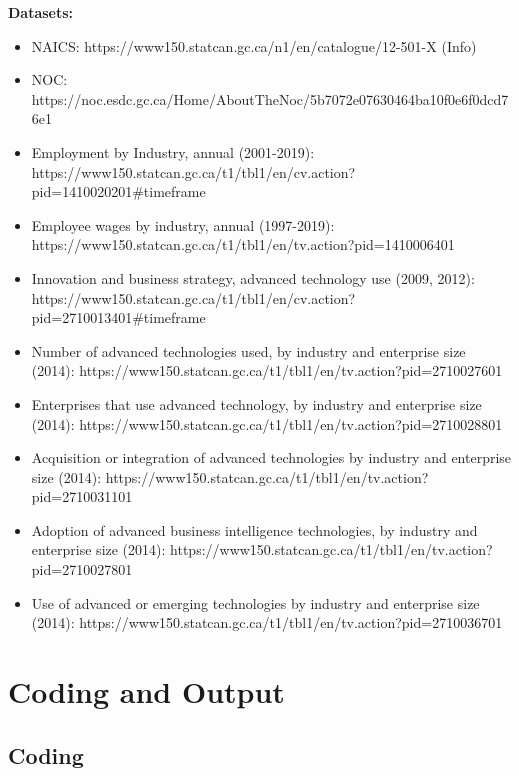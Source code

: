 \documentclass[12pt]{article}
\begin{document}
\begin{flushleft}
\textbf{Datasets:}
\begin{itemize}
\item NAICS:
\break
https://www150.statcan.gc.ca/n1/en/catalogue/12-501-X (Info)
\item NOC:
https://noc.esdc.gc.ca/Home/AboutTheNoc/5b7072e07630464ba10f0e6f0dcd76e1
\item Employment by Industry, annual (2001-2019):
\break
https://www150.statcan.gc.ca/t1/tbl1/en/cv.action?pid=1410020201\#timeframe 
\item Employee wages by industry, annual (1997-2019):
\break
https://www150.statcan.gc.ca/t1/tbl1/en/tv.action?pid=1410006401
\item Innovation and business strategy, advanced technology use (2009, 2012):
\break
https://www150.statcan.gc.ca/t1/tbl1/en/cv.action?pid=2710013401\#timeframe 
\item Number of advanced technologies used, by industry and enterprise size (2014):
\break
https://www150.statcan.gc.ca/t1/tbl1/en/tv.action?pid=2710027601 
\item Enterprises that use advanced technology, by industry and enterprise size (2014):
\break
https://www150.statcan.gc.ca/t1/tbl1/en/tv.action?pid=2710028801
\item Acquisition or integration of advanced technologies by industry and enterprise size (2014):
\break
https://www150.statcan.gc.ca/t1/tbl1/en/tv.action?pid=2710031101
\item Adoption of advanced business intelligence technologies, by industry and enterprise size (2014):
\break
https://www150.statcan.gc.ca/t1/tbl1/en/tv.action?pid=2710027801 
\item Use of advanced or emerging technologies by industry and enterprise size (2014):
\break
https://www150.statcan.gc.ca/t1/tbl1/en/tv.action?pid=2710036701
\end{itemize}
\end{flushleft}

\newpage

\section{Coding and Output}

\subsection{Coding}
\end{document}
